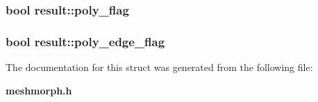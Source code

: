 \subsubsection{\setlength{\rightskip}{0pt plus 5cm}bool {\bf result::poly\_\-flag}}\label{structresult_a17567c5f302f2f166926fce371a3235}


\subsubsection{\setlength{\rightskip}{0pt plus 5cm}bool {\bf result::poly\_\-edge\_\-flag}}\label{structresult_4ef7154e57c1ccee2103f378e12c7438}




The documentation for this struct was generated from the following file:\begin{CompactItemize}
\item 
{\bf meshmorph.h}\end{CompactItemize}
